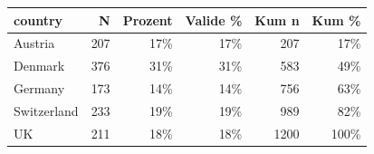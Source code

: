 \documentclass[
  a4paper,
  DIV=11,
  numbers=noendperiod]{scrartcl}
\begin{document}
\begin{table}
\fontsize{13.5pt}{16.2pt}\selectfont
\begin{tabular*}{\linewidth}{@{\extracolsep{\fill}}lrrrrr}
\toprule
country & N & Prozent & Valide \% & Kum n & Kum \% \\ 
\midrule\addlinespace[2.5pt]
Austria & 207 & 17\% & 17\% & 207 & 17\% \\ 
Denmark & 376 & 31\% & 31\% & 583 & 49\% \\ 
Germany & 173 & 14\% & 14\% & 756 & 63\% \\ 
Switzerland & 233 & 19\% & 19\% & 989 & 82\% \\ 
UK & 211 & 18\% & 18\% & 1200 & 100\% \\ 
\bottomrule
\end{tabular*}
\end{table}
\end{document}
